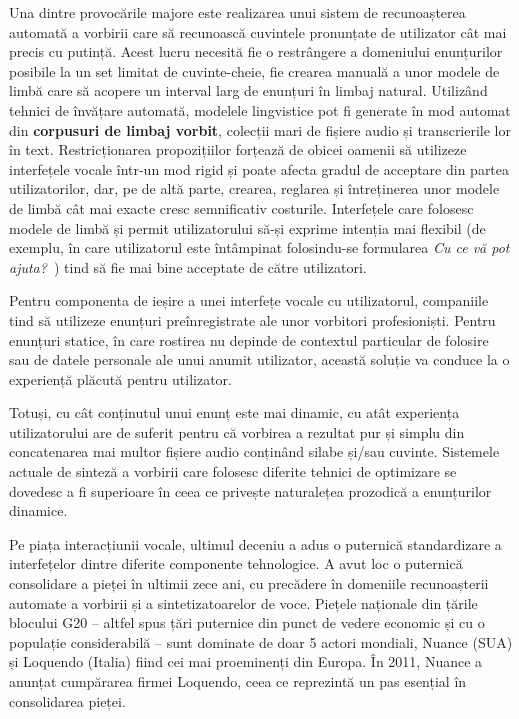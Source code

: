 \begin{multicols}{2}

Una dintre provocările majore este realizarea unui sistem de recunoașterea automată a vorbirii care să recunoască cuvintele pronunțate de utilizator cât mai precis cu putință. Acest lucru necesită fie o restrângere a domeniului enunțurilor posibile la un set limitat de cuvinte-cheie, fie crearea manuală a unor modele de limbă care să acopere un interval larg de enunțuri în limbaj natural. Utilizând tehnici de învățare automată, modelele lingvistice pot fi generate în mod automat din \textbf{corpusuri de limbaj vorbit}, colecții mari de fișiere audio și transcrierile lor în text. Restricționarea propozițiilor forțează de obicei oamenii să utilizeze interfețele vocale \mbox{într-un} mod rigid și poate afecta gradul de acceptare din partea utilizatorilor, dar, pe de altă parte, crearea, reglarea și întreținerea unor modele de limbă cât mai exacte cresc semnificativ costurile. Interfețele care folosesc modele de limbă și permit utilizatorului \mbox{să-și} exprime intenția mai flexibil (de exemplu, în care utilizatorul este întâmpinat folosindu-se formularea \textit{Cu ce vă pot ajuta?}~) tind să fie mai bine acceptate de către utilizatori.

Pentru componenta de ieșire a unei interfețe vocale cu utilizatorul, companiile tind să utilizeze enunțuri preînregistrate ale unor vorbitori profesioniști. Pentru enunțuri statice, în care rostirea nu depinde de contextul particular de folosire sau de datele personale ale unui anumit utilizator, această soluție va conduce la o experiență plăcută pentru utilizator. 

Totuși, cu cât conținutul unui enunț este mai dinamic, cu atât experiența utilizatorului are de suferit pentru că vorbirea a rezultat pur și simplu din concatenarea mai multor fișiere audio conținând silabe și/sau cuvinte. Sistemele actuale de sinteză a vorbirii care folosesc diferite tehnici de optimizare se dovedesc a fi superioare în ceea ce privește naturalețea prozodică a enunțurilor dinamice.

Pe piața interacțiunii vocale, ultimul deceniu a adus o puternică standardizare a interfețelor dintre diferite componente tehnologice. A avut loc o puternică consolidare a pieței în ultimii zece ani, cu precădere în domeniile recunoașterii automate a vorbirii și a sintetizatoarelor de voce. Piețele naționale din țările blocului G20 -- altfel spus țări puternice din punct de vedere economic și cu o populație considerabilă -- sunt dominate de doar 5 actori mondiali, Nuance (SUA) și Loquendo (Italia) fiind cei mai proeminenți din Europa. În 2011, Nuance a anunțat cumpărarea firmei Loquendo, ceea ce reprezintă un pas esențial în consolidarea pieței.


\end{multicols}

